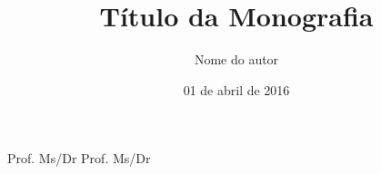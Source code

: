 
\title{T\'itulo da Monografia}
\author{Nome do autor}
\advisorplace{}
\date{01 de abril de 2016}

\banca        %
{Prof. Ms/Dr}{}
{Prof. Ms/Dr}{}
{}{} %
{}{}    %


\newtoggle{full}
\toggletrue{full}
